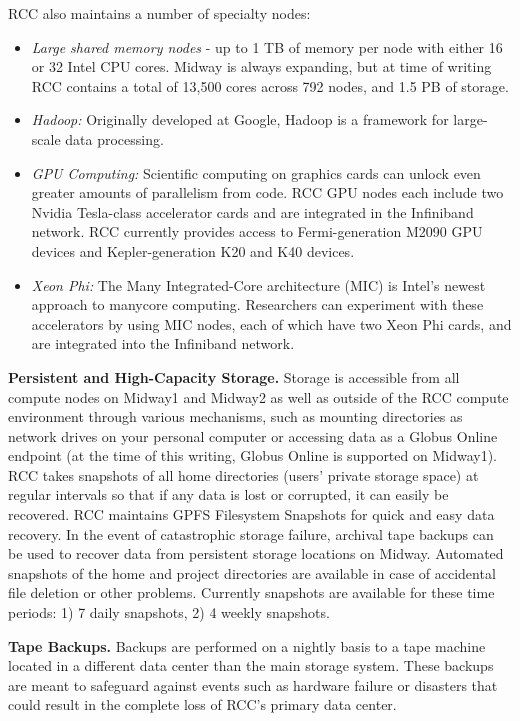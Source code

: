 RCC also maintains a number of specialty nodes: 
\begin{itemize}
\item \textit{\color{gray} Large shared memory nodes} - up to 1 TB of memory per node with either 16 or 32 Intel CPU cores. Midway is always expanding, but at time of writing RCC contains a total of 13,500 cores across 792 nodes, and 1.5 PB of storage.
\item  \textit{\color{gray}  Hadoop:} Originally developed at Google, Hadoop is a framework for large-scale data processing.   \item  \textit{\color{gray}  GPU Computing:} Scientific computing on graphics cards can unlock even greater amounts of parallelism from code. RCC GPU nodes each include two Nvidia Tesla-class accelerator cards and are integrated in the Infiniband network. RCC currently provides access to Fermi-generation M2090 GPU devices and Kepler-generation K20 and K40 devices.  \item  \textit{\color{gray}  Xeon Phi:} The Many Integrated-Core architecture (MIC) is Intel's newest approach to manycore computing. Researchers can experiment with these accelerators by using  MIC nodes, each of which have two Xeon Phi cards, and are integrated into the Infiniband network.
\end{itemize}

\textbf{Persistent and High-Capacity Storage.} Storage is accessible from all compute nodes on Midway1 and Midway2 as well as outside of the RCC compute environment through various mechanisms, such as mounting directories as network drives on your personal computer or accessing data as a Globus Online endpoint (at the time of this writing, Globus Online is supported on Midway1). RCC takes snapshots of all home directories (users' private storage space) at regular intervals so that if any data is lost or corrupted, it can easily be recovered. RCC maintains GPFS Filesystem Snapshots for quick and easy data recovery.  In the event of catastrophic storage failure, archival tape backups can be used to recover data from persistent storage locations on Midway. Automated snapshots of the home and project directories are available in case of accidental file deletion or other problems. Currently snapshots are available for these time periods: 1) 7 daily snapshots, 2) 4 weekly snapshots.

\textbf{Tape Backups.} Backups are performed on a nightly basis to a tape machine located in a different data center than the main storage system. These backups are meant to safeguard against events such as hardware failure or disasters that could result in the complete loss of RCC’s primary data center.


